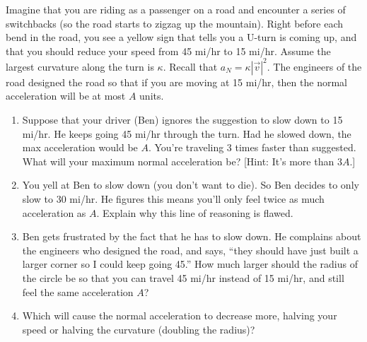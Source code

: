 \begin{problem}
 Imagine that you are riding as a passenger on a road and encounter a series of switchbacks (so the road starts to zigzag up the mountain). Right before each bend in the road, you see a yellow sign that tells you a U-turn is coming up, and that you should reduce your speed from 45 mi/hr to 15 mi/hr.  Assume the largest curvature along the turn is $\kappa$. Recall that $a_N=\kappa |\vec v|^2$. The engineers of the road designed the road so that if you are moving at 15 mi/hr, then the normal acceleration will be at most $A$ units. 
\begin{enumerate}
 \item Suppose that your driver (Ben) ignores the suggestion to slow down to 15 mi/hr.  He keeps going 45 mi/hr through the turn. Had he slowed down, the max acceleration would be $A$.  You're traveling 3 times faster than suggested.  What will your maximum normal acceleration be? [Hint: It's more than $3A$.]
 \item You yell at Ben to slow down (you don't want to die). So Ben decides to only slow to 30 mi/hr. He figures this means you'll only feel twice as much acceleration as $A$.  Explain why this line of reasoning is flawed.
 \item Ben gets frustrated by the fact that he has to slow down. He complains about the engineers who designed the road, and says, ``they should have just built a larger corner so I could keep going 45.''  How much larger should the radius of the circle be so that you can travel 45 mi/hr instead of 15 mi/hr, and still feel the same acceleration $A$?
 \item Which will cause the normal acceleration to decrease more, halving your speed or halving the curvature (doubling the radius)?
\end{enumerate}
\end{problem}



